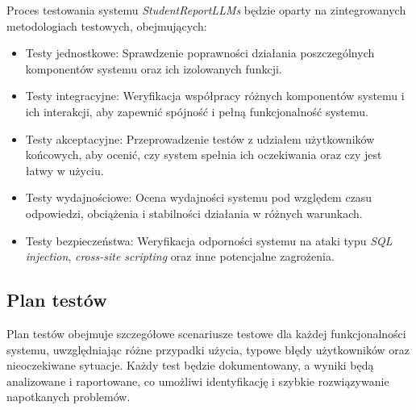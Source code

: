 \documentclass[a4paper, 12pt]{article}
\begin{document}
Proces testowania systemu \textit{StudentReportLLMs} będzie oparty na zintegrowanych metodologiach testowych, obejmujących:

\begin{itemize}
\item Testy jednostkowe: Sprawdzenie poprawności działania poszczególnych komponentów systemu oraz ich izolowanych funkcji.
\item Testy integracyjne: Weryfikacja współpracy różnych komponentów systemu i ich interakcji, aby zapewnić spójność i pełną funkcjonalność systemu.
\item Testy akceptacyjne: Przeprowadzenie testów z udziałem użytkowników końcowych, aby ocenić, czy system spełnia ich oczekiwania oraz czy jest łatwy w użyciu.
\item Testy wydajnościowe: Ocena wydajności systemu pod względem czasu odpowiedzi, obciążenia i stabilności działania w różnych warunkach.
\item Testy bezpieczeństwa: Weryfikacja odporności systemu na ataki typu \textit{SQL injection}, \textit{cross-site scripting} oraz inne potencjalne zagrożenia.
\end{itemize}

\subsection{Plan testów}

Plan testów obejmuje szczegółowe scenariusze testowe dla każdej funkcjonalności systemu, uwzględniając różne przypadki użycia, typowe błędy użytkowników oraz nieoczekiwane sytuacje. Każdy test będzie dokumentowany, a wyniki będą analizowane i raportowane, co umożliwi identyfikację i szybkie rozwiązywanie napotkanych problemów.
\end{document}
